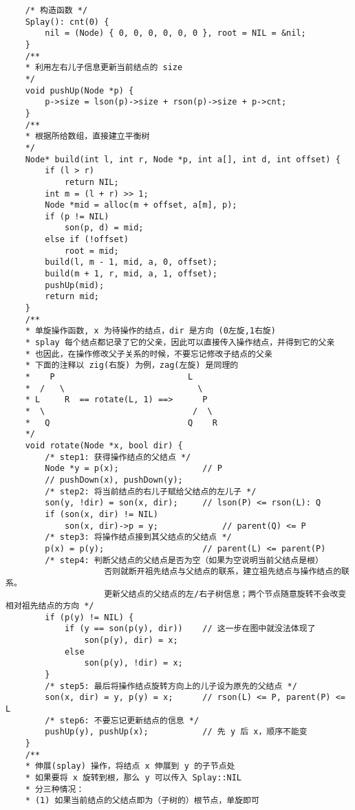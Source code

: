 \begin{verbatim}
    /* 构造函数 */
    Splay(): cnt(0) {
        nil = (Node) { 0, 0, 0, 0, 0, 0 }, root = NIL = &nil;
    }
    /**
    * 利用左右儿子信息更新当前结点的 size 
    */
    void pushUp(Node *p) {
        p->size = lson(p)->size + rson(p)->size + p->cnt;
    }
    /**
    * 根据所给数组，直接建立平衡树
    */
    Node* build(int l, int r, Node *p, int a[], int d, int offset) {
        if (l > r)
            return NIL;
        int m = (l + r) >> 1;
        Node *mid = alloc(m + offset, a[m], p);
        if (p != NIL)
            son(p, d) = mid;
        else if (!offset)
            root = mid;
        build(l, m - 1, mid, a, 0, offset);
        build(m + 1, r, mid, a, 1, offset);
        pushUp(mid);
        return mid;
    }    
    /**
    * 单旋操作函数, x 为待操作的结点，dir 是方向 (0左旋,1右旋) 
    * splay 每个结点都记录了它的父亲，因此可以直接传入操作结点，并得到它的父亲
    * 也因此，在操作修改父子关系的时候，不要忘记修改子结点的父亲 
    * 下面的注释以 zig(右旋) 为例，zag(左旋) 是同理的 
    *    P                           L              
    *  /   \                           \ 
    * L     R  == rotate(L, 1) ==>      P 
    *  \                              /  \        
    *   Q                            Q    R   
    */
    void rotate(Node *x, bool dir) {
        /* step1: 获得操作结点的父结点 */
        Node *y = p(x);                 // P
        // pushDown(x), pushDown(y);
        /* step2: 将当前结点的右儿子赋给父结点的左儿子 */
        son(y, !dir) = son(x, dir);     // lson(P) <= rson(L): Q
        if (son(x, dir) != NIL)
            son(x, dir)->p = y;             // parent(Q) <= P
        /* step3: 将操作结点接到其父结点的父结点 */
        p(x) = p(y);                    // parent(L) <= parent(P)
        /* step4: 判断父结点的父结点是否为空（如果为空说明当前父结点是根）
                    否则就断开祖先结点与父结点的联系，建立祖先结点与操作结点的联系。
                    更新父结点的父结点的左/右子树信息；两个节点随意旋转不会改变相对祖先结点的方向 */ 
        if (p(y) != NIL) {
            if (y == son(p(y), dir))    // 这一步在图中就没法体现了 
                son(p(y), dir) = x;
            else 
                son(p(y), !dir) = x;
        }
        /* step5: 最后将操作结点旋转方向上的儿子设为原先的父结点 */
        son(x, dir) = y, p(y) = x;      // rson(L) <= P, parent(P) <= L
        /* step6: 不要忘记更新结点的信息 */
        pushUp(y), pushUp(x);           // 先 y 后 x，顺序不能变 
    }
    /**
    * 伸展(splay) 操作，将结点 x 伸展到 y 的子节点处
    * 如果要将 x 旋转到根，那么 y 可以传入 Splay::NIL 
    * 分三种情况：
    * (1) 如果当前结点的父结点即为（子树的）根节点，单旋即可

\end{verbatim}
